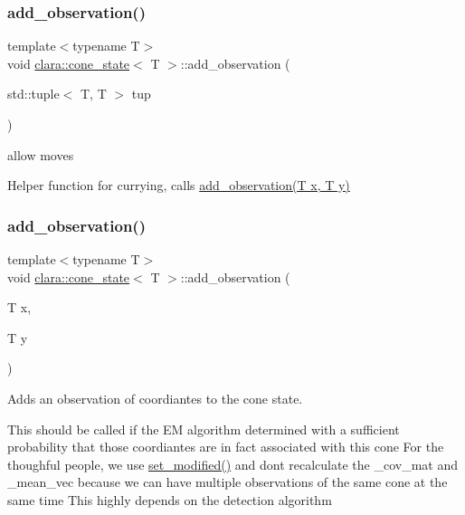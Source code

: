 \subsubsection{\texorpdfstring{add\+\_\+observation()}{add\_observation()}\hspace{0.1cm}{\footnotesize\ttfamily [1/2]}}
{\footnotesize\ttfamily template$<$typename T$>$ \\
void \hyperlink{classclara_1_1cone__state}{clara\+::cone\+\_\+state}$<$ T $>$\+::add\+\_\+observation (\begin{DoxyParamCaption}\item[{std\+::tuple$<$ T, T $>$}]{tup }\end{DoxyParamCaption})\hspace{0.3cm}{\ttfamily [inline]}}



allow moves 

Helper function for currying, calls \hyperlink{classclara_1_1cone__state_a7cd7364ca787c25b0ca333d0cb1c3081}{add\+\_\+observation(\+T x, T y)} \mbox{\label{classclara_1_1cone__state_a7cd7364ca787c25b0ca333d0cb1c3081}} 
\subsubsection{\texorpdfstring{add\+\_\+observation()}{add\_observation()}\hspace{0.1cm}{\footnotesize\ttfamily [2/2]}}
{\footnotesize\ttfamily template$<$typename T$>$ \\
void \hyperlink{classclara_1_1cone__state}{clara\+::cone\+\_\+state}$<$ T $>$\+::add\+\_\+observation (\begin{DoxyParamCaption}\item[{T}]{x,  }\item[{T}]{y }\end{DoxyParamCaption})\hspace{0.3cm}{\ttfamily [inline]}}



Adds an observation of coordiantes to the cone state. 

This should be called if the EM algorithm determined with a sufficient probability that those coordiantes are in fact associated with this cone For the thoughful people, we use {\ttfamily \hyperlink{classclara_1_1cone__state_ac9712fb4aee53df62da1cd320a45f813}{set\+\_\+modified()}} and don\textquotesingle{}t recalculate the {\ttfamily \+\_\+cov\+\_\+mat} and {\ttfamily \+\_\+mean\+\_\+vec} because we can have multiple observations of the same cone at the same time This highly depends on the detection algorithm

